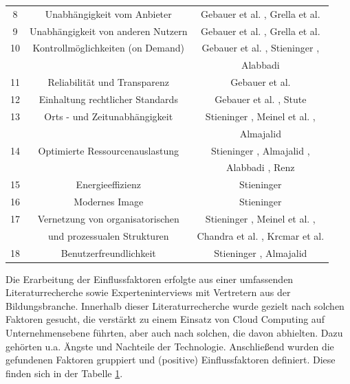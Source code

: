 \begin{table}[!tbp]
\begin{center}
{\begin{tabular}{c c c }
				8 & Unabhängigkeit vom Anbieter & Gebauer et al. \cite{gebauer}, Grella et al. \cite{grella} \\
				9 & Unabhängigkeit von anderen Nutzern & Gebauer et al. \cite{gebauer}, Grella et al. \cite{grella} \\
				10 & Kontrollmöglichkeiten (on Demand) & Gebauer et al. \cite{gebauer}, Stieninger \cite{stieninger}, \\
				&& Alabbadi \cite{alabbadi} \\
				11 & Reliabilität und Transparenz & Gebauer et al. \cite{gebauer} \\
				12 & Einhaltung rechtlicher Standards & Gebauer et al. \cite{gebauer}, Stute \cite{stute} \\
				13 & Orts - und Zeitunabhängigkeit & Stieninger \cite{stieninger}, Meinel et al. \cite{meinel} \cite{meinel2}, \\
				&& Almajalid \cite{almajalid} \\
				14 & Optimierte Ressourcenauslastung & Stieninger \cite{stieninger}, Almajalid \cite{almajalid}, \\
				&& Alabbadi \cite{alabbadi}, Renz \cite{renz} \\
				15 & Energieeffizienz & Stieninger \cite{stieninger} \\
				16 & Modernes Image & Stieninger \cite{stieninger} \\
				17 & Vernetzung von organisatorischen & Stieninger \cite{stieninger}, Meinel et al. \cite{meinel}, \\
				& und prozessualen Strukturen & Chandra et al. \cite{chandra}, Krcmar et al. \cite{krcmar} \\
				18 & Benutzerfreundlichkeit & Stieninger \cite{stieninger}, Almajalid \cite{almajalid} \\
				\hline
			\end{tabular}
		}
		\label{tab:factors1}
	\end{center}
\end{table}
\FloatBarrier

Die Erarbeitung der Einflussfaktoren erfolgte aus einer umfassenden Literaturrecherche sowie Experteninterviews mit Vertretern aus der Bildungsbranche. Innerhalb dieser Literaturrecherche wurde gezielt nach solchen Faktoren gesucht, die verstärkt zu einem Einsatz von Cloud Computing auf Unternehmensebene führten, aber auch nach solchen, die davon abhielten. Dazu gehörten u.a. Ängste und Nachteile der Technologie. Anschließend wurden die gefundenen Faktoren gruppiert und (positive) Einflussfaktoren definiert. Diese finden sich in der Tabelle \ref{tab:factors1}.

